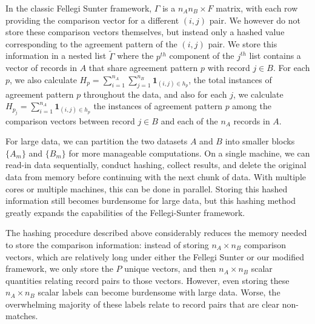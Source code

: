 \documentclass[
  12pt,
]{article}
\begin{document}
In the classic Fellegi Sunter framework, \(\Gamma\) is a
\(n_A n_B \times F\) matrix, with each row providing the comparison
vector for a different \((i,j)\) pair. We however do not store these
comparison vectors themselves, but instead only a hashed value
corresponding to the agreement pattern of the \((i, j)\) pair. We store
this information in a nested list \(\tilde{\Gamma}\) where the
\(p^{th}\) component of the \(j^{th}\) list contains a vector of records
in \(A\) that share agreement pattern \(p\) with record \(j \in B\). For
each \(p\), we also calculate
\(H_p = \sum_{i=1}^{n_A}\sum_{j=1}^{n_B} \mathbf{1}_{(i,j) \in h_p}\),
the total instances of agreement pattern \(p\) throughout the data, and
also for each \(j\), we calculate
\(H_{p_j} = \sum_{i=1}^{n_A} \mathbf{1}_{{(i,j) \in h_p}}\) the
instances of agreement pattern \(p\) among the comparison vectors
between record \(j \in B\) and each of the \(n_A\) records in \(A\).

For large data, we can partition the two datasets \(A\) and \(B\) into
smaller blocks \(\{A_m\}\) and \(\{B_m\}\) for more manageable
computations. On a single machine, we can read-in data sequentially,
conduct hashing, collect results, and delete the original data from
memory before continuing with the next chunk of data. With multiple
cores or multiple machines, this can be done in parallel. Storing this
hashed information still becomes burdensome for large data, but this
hashing method greatly expands the capabilities of the Fellegi-Sunter
framework.

The hashing procedure described above considerably reduces the memory
needed to store the comparison information: instead of storing
\(n_A \times n_B\) comparison vectors, which are relatively long under
either the Fellegi Sunter or our modified framework, we only store the
\(P\) unique vectors, and then \(n_A \times n_B\) scalar quantities
relating record pairs to those vectors. However, even storing these
\(n_A \times n_B\) scalar labels can become burdensome with large data.
Worse, the overwhelming majority of these labels relate to record pairs
that are clear non-matches.
\end{document}
